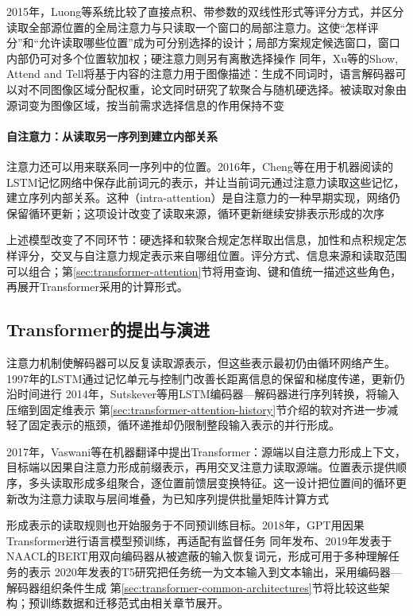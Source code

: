 2015年，Luong等系统比较了直接点积、带参数的双线性形式等评分方式，并区分读取全部源位置的全局注意力与只读取一个窗口的局部注意力。这使“怎样评分”和“允许读取哪些位置”成为可分别选择的设计；局部方案规定候选窗口，窗口内部仍可对多个位置软加权；硬注意力则另有离散选择操作 同年，Xu等的Show, Attend and Tell将基于内容的注意力用于图像描述：生成不同词时，语言解码器可以对不同图像区域分配权重，论文同时研究了软聚合与随机硬选择。被读取对象由源词变为图像区域，按当前需求选择信息的作用保持不变

\paragraph{自注意力：从读取另一序列到建立内部关系}
注意力还可以用来联系同一序列中的位置。2016年，Cheng等在用于机器阅读的LSTM记忆网络中保存此前词元的表示，并让当前词元通过注意力读取这些记忆，建立序列内部关系。这种（intra-attention）是自注意力的一种早期实现，网络仍保留循环更新；这项设计改变了读取来源，循环更新继续安排表示形成的次序

上述模型改变了不同环节：硬选择和软聚合规定怎样取出信息，加性和点积规定怎样评分，交叉与自注意力规定表示来自哪组位置。评分方式、信息来源和读取范围可以组合；第\ref{sec:transformer-attention}节将用查询、键和值统一描述这些角色，再展开Transformer采用的计算形式。

\subsection{Transformer的提出与演进}
\label{sec:transformer-architecture-history}

注意力机制使解码器可以反复读取源表示，但这些表示最初仍由循环网络产生。1997年的LSTM通过记忆单元与控制门改善长距离信息的保留和梯度传递，更新仍沿时间进行 2014年，Sutskever等用LSTM编码器—解码器进行序列转换，将输入压缩到固定维表示 第\ref{sec:transformer-attention-history}节介绍的软对齐进一步减轻了固定表示的瓶颈，循环递推却仍限制整段输入表示的并行形成。

2017年，Vaswani等在机器翻译中提出Transformer：源端以自注意力形成上下文，目标端以因果自注意力形成前缀表示，再用交叉注意力读取源端。位置表示提供顺序，多头读取形成多组聚合，逐位置前馈层变换特征。这一设计把位置间的循环更新改为注意力读取与层间堆叠，为已知序列提供批量矩阵计算方式

\Needspace{165mm}
形成表示的读取规则也开始服务于不同预训练目标。2018年，GPT用因果Transformer进行语言模型预训练，再适配有监督任务 同年发布、2019年发表于NAACL的BERT用双向编码器从被遮蔽的输入恢复词元，形成可用于多种理解任务的表示 2020年发表的T5研究把任务统一为文本输入到文本输出，采用编码器—解码器组织条件生成 第\ref{sec:transformer-common-architectures}节将比较这些架构；预训练数据和迁移范式由相关章节展开。

